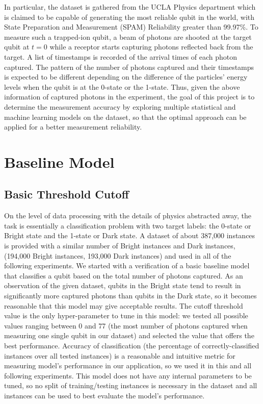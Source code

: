 \documentclass[letterpaper,twocolumn,10pt]{article}
\begin{document}
In particular, the dataset is gathered from the UCLA Physics department which is claimed to be capable of generating the most reliable qubit in the world, with State Preparation and Measurement (SPAM) Reliability greater than 99.97\%. To measure such a trapped-ion qubit, a beam of photons are shooted at the target qubit at $t = 0$ while a receptor starts capturing photons reflected back from the target. A list of timestamps is recorded of the arrival times of each photon captured. The pattern of the number of photons captured and their timestamps is expected to be different depending on the difference of the particles' energy levels when the qubit is at the 0-state or the 1-state. Thus, given the above information of captured photons in the experiment, the goal of this project is to determine the measurement accuracy by exploring multiple statistical and machine learning models on the dataset, so that the optimal approach can be applied for a better measurement reliability. 

\section{Baseline Model}

\subsection{Basic Threshold Cutoff}

On the level of data processing with the details of physics abstracted away, the task is essentially a classification problem with two target labels: the 0-state or Bright state and the 1-state or Dark state. A dataset of about 387,000 instances is provided with a similar number of Bright instances and Dark instances, (194,000 Bright instances, 193,000 Dark instances) and used in all of the following experiments. We started with a verification of a basic baseline model that classifies a qubit based on the total number of photons captured. As an observation of the given dataset, qubits in the Bright state tend to result in significantly more captured photons than qubits in the Dark state, so it becomes reasonable that this model may give acceptable results. The cutoff threshold value is the only hyper-parameter to tune in this model: we tested all possible values ranging between 0 and 77 (the most number of photons captured when measuring one single qubit in our dataset) and selected the value that offers the best performance. Accuracy of classification (the percentage of correctly-classified instances over all tested instances) is a reasonable and intuitive metric for measuring model's performance in our application, so we used it in this and all following experiments. This model does not have any internal parameters to be tuned, so no split of training/testing instances is necessary in the dataset and all instances can be used to best evaluate the model's performance.
\end{document}
